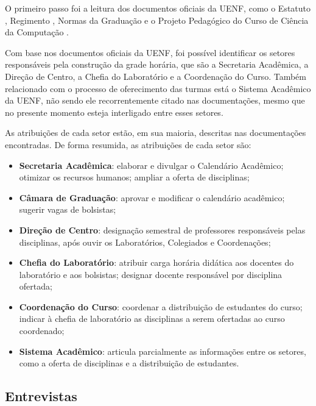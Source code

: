 O primeiro passo foi a leitura dos documentos oficiais da UENF, como o Estatuto \cite{Estatuto2002}, Regimento \cite{Regimento2012}, Normas da Graduação \cite{Normas2012} e o Projeto Pedagógico do Curso de Ciência da Computação \cite{PPCCC2015}.


Com base nos documentos oficiais da UENF, foi possível identificar os setores responsáveis pela construção da grade horária, que são a Secretaria Acadêmica, a Direção de Centro, a Chefia do Laboratório e a Coordenação do Curso. Também relacionado com o processo de oferecimento das turmas está o Sistema Acadêmico da UENF, não sendo ele recorrentemente citado nas documentações, mesmo que no presente momento esteja interligado entre esses setores.

As atribuições de cada setor estão, em sua maioria, descritas nas documentações encontradas. De forma resumida, as atribuições de cada setor são:

\begin{itemize}
  \item \textbf{Secretaria Acadêmica}: elaborar e divulgar o Calendário Acadêmico; otimizar os recursos humanos; ampliar a oferta de disciplinas;
  \item \textbf{Câmara de Graduação}: aprovar e modificar o calendário acadêmico; sugerir vagas de bolsistas;
  \item \textbf{Direção de Centro}: designação semestral de professores responsáveis pelas disciplinas, após ouvir os Laboratórios, Colegiados e Coordenações;
  \item \textbf{Chefia do Laboratório}: atribuir carga horária didática aos docentes do laboratório e aos bolsistas; designar docente responsável por disciplina ofertada;
  \item \textbf{Coordenação do Curso}: coordenar a distribuição de estudantes do curso; indicar à chefia de laboratório as disciplinas a serem ofertadas ao curso coordenado;
  \item \textbf{Sistema Acadêmico}: articula parcialmente as informações entre os setores, como a oferta de disciplinas e a distribuição de estudantes.
\end{itemize}


\subsection{Entrevistas}

